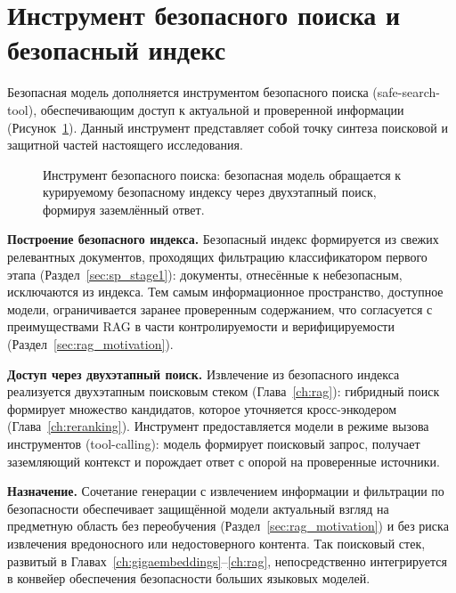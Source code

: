 \section{Инструмент безопасного поиска и безопасный индекс}\label{sec:sp_safe_search}

Безопасная модель дополняется инструментом безопасного поиска (safe-search-tool), обеспечивающим доступ к актуальной и проверенной информации (Рисунок~\ref{fig:safe_search_tool}).
Данный инструмент представляет собой точку синтеза поисковой и защитной частей настоящего исследования.

\begin{figure}[htbp]
    \centering
    \resizebox{0.95\textwidth}{!}{
        
    }
    \caption{Инструмент безопасного поиска: безопасная модель обращается к курируемому безопасному индексу через двухэтапный поиск, формируя заземлённый ответ.}
    \label{fig:safe_search_tool}
\end{figure}

\textbf{Построение безопасного индекса.} Безопасный индекс формируется из свежих релевантных документов, проходящих фильтрацию классификатором первого этапа (Раздел~\ref{sec:sp_stage1}): документы, отнесённые к небезопасным, исключаются из индекса.
Тем самым информационное пространство, доступное модели, ограничивается заранее проверенным содержанием, что согласуется с преимуществами RAG в части контролируемости и верифицируемости (Раздел~\ref{sec:rag_motivation}).

\textbf{Доступ через двухэтапный поиск.} Извлечение из безопасного индекса реализуется двухэтапным поисковым стеком (Глава~\ref{ch:rag}): гибридный поиск формирует множество кандидатов, которое уточняется кросс-энкодером (Глава~\ref{ch:reranking}).
Инструмент предоставляется модели в режиме вызова инструментов (tool-calling): модель формирует поисковый запрос, получает заземляющий контекст и порождает ответ с опорой на проверенные источники.

\textbf{Назначение.} Сочетание генерации с извлечением информации и фильтрации по безопасности обеспечивает защищённой модели актуальный взгляд на предметную область без переобучения (Раздел~\ref{sec:rag_motivation}) и без риска извлечения вредоносного или недостоверного контента.
Так поисковый стек, развитый в Главах~\ref{ch:gigaembeddings}--\ref{ch:rag}, непосредственно интегрируется в конвейер обеспечения безопасности больших языковых моделей.

